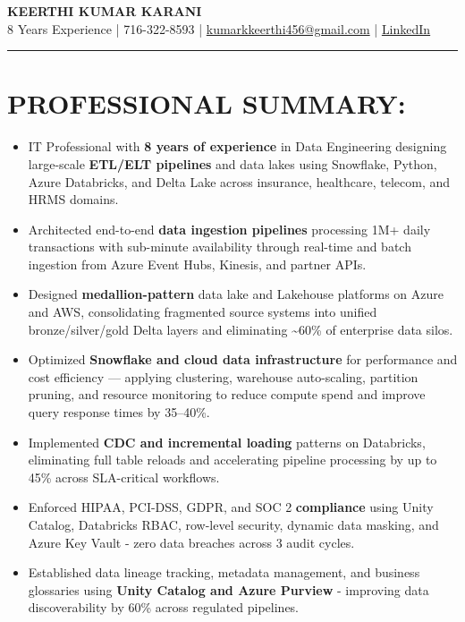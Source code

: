 \documentclass[a4paper,10pt]{article}
\begin{document}
\begin{center}
    {\LARGE \textbf{KEERTHI KUMAR KARANI}} \\
    \vspace{6pt}
    8 Years Experience | 716-322-8593 | \href{mailto:kumarkkeerthi456@gmail.com}{kumarkkeerthi456@gmail.com} | \href{https://www.linkedin.com}{LinkedIn}
\end{center}
\hrule
\vspace{6pt}

\section*{PROFESSIONAL SUMMARY:}
\begin{itemize}
    \item IT Professional with \textbf{8 years of experience} in Data Engineering designing large-scale \textbf{ETL/ELT pipelines} and data lakes using Snowflake, Python, Azure Databricks, and Delta Lake across insurance, healthcare, telecom, and HRMS domains.
    \item Architected end-to-end \textbf{data ingestion pipelines} processing 1M+ daily transactions with sub-minute availability through real-time and batch ingestion from Azure Event Hubs, Kinesis, and partner APIs.
    \item Designed \textbf{medallion-pattern} data lake and Lakehouse platforms on Azure and AWS, consolidating fragmented source systems into unified bronze/silver/gold Delta layers and eliminating \textasciitilde 60\% of enterprise data silos.
    \item Optimized \textbf{Snowflake and cloud data infrastructure} for performance and cost efficiency — applying clustering, warehouse auto-scaling, partition pruning, and resource monitoring to reduce compute spend and improve query response times by 35--40\%.
    \item Implemented \textbf{CDC and incremental loading} patterns on Databricks, eliminating full table reloads and accelerating pipeline processing by up to 45\% across SLA-critical workflows.
    \item Enforced HIPAA, PCI-DSS, GDPR, and SOC 2 \textbf{compliance} using Unity Catalog, Databricks RBAC, row-level security, dynamic data masking, and Azure Key Vault - zero data breaches across 3 audit cycles.
    \item Established data lineage tracking, metadata management, and business glossaries using \textbf{Unity Catalog and Azure Purview} - improving data discoverability by 60\% across regulated pipelines.

\end{itemize}
\end{document}
